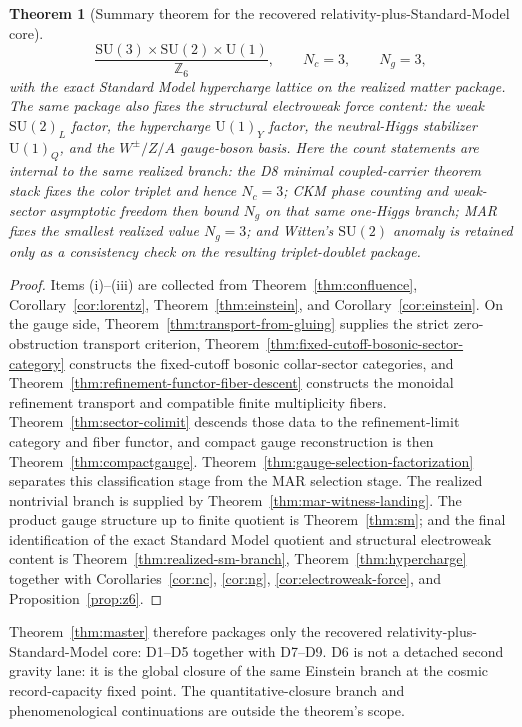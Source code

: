 \documentclass[11pt]{article}
\newtheorem{theorem}{Theorem}[section]
\newcommand{\SU}{\mathrm{SU}}
\newcommand{\U}{\mathrm{U}}
\begin{document}
\begin{theorem}[Summary theorem for the recovered relativity-plus-Standard-Model core]
\[
\frac{\SU(3)\times\SU(2)\times\U(1)}{\mathbb Z_6},
\qquad
N_c=3,
\qquad
N_g=3,
\]
with the exact Standard Model hypercharge lattice on the realized matter package. The same package also fixes the structural electroweak force content: the weak \(\SU(2)_L\) factor, the hypercharge \(\U(1)_Y\) factor, the neutral-Higgs stabilizer \(\U(1)_Q\), and the \(W^\pm/Z/A\) gauge-boson basis. Here the count statements are internal to the same realized branch: the D8 minimal coupled-carrier theorem stack fixes the color triplet and hence \(N_c=3\); CKM phase counting and weak-sector asymptotic freedom then bound \(N_g\) on that same one-Higgs branch; MAR fixes the smallest realized value \(N_g=3\); and Witten's \(\SU(2)\) anomaly is retained only as a consistency check on the resulting triplet-doublet package.
\end{theorem}

\begin{proof}
Items (i)--(iii) are collected from Theorem~\ref{thm:confluence}, Corollary~\ref{cor:lorentz}, Theorem~\ref{thm:einstein}, and Corollary~\ref{cor:einstein}. On the gauge side, Theorem~\ref{thm:transport-from-gluing} supplies the strict zero-obstruction transport criterion, Theorem~\ref{thm:fixed-cutoff-bosonic-sector-category} constructs the fixed-cutoff bosonic collar-sector categories, and Theorem~\ref{thm:refinement-functor-fiber-descent} constructs the monoidal refinement transport and compatible finite multiplicity fibers. Theorem~\ref{thm:sector-colimit} descends those data to the refinement-limit category and fiber functor, and compact gauge reconstruction is then Theorem~\ref{thm:compactgauge}. Theorem~\ref{thm:gauge-selection-factorization} separates this classification stage from the MAR selection stage. The realized nontrivial branch is supplied by Theorem~\ref{thm:mar-witness-landing}. The product gauge structure up to finite quotient is Theorem~\ref{thm:sm}; and the final identification of the exact Standard Model quotient and structural electroweak content is Theorem~\ref{thm:realized-sm-branch}, Theorem~\ref{thm:hypercharge} together with Corollaries~\ref{cor:nc}, \ref{cor:ng}, \ref{cor:electroweak-force}, and Proposition~\ref{prop:z6}.
\end{proof}

Theorem~\ref{thm:master} therefore packages only the recovered relativity-plus-Standard-Model core: D1--D5 together with D7--D9. D6 is not a detached second gravity lane: it is the global closure of the same Einstein branch at the cosmic record-capacity fixed point. The quantitative-closure branch and phenomenological continuations are outside the theorem's scope.
\end{document}
